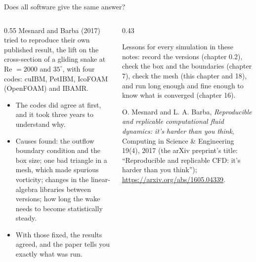 \documentclass[aspectratio=169,11pt]{beamer}
\begin{document}
\begin{frame}{Does all software give the same answer?}
\begin{columns}[T,onlytextwidth]
\begin{column}{0.55\textwidth}
Mesnard and Barba (2017) tried to reproduce their own published result, the lift on the cross-section of a gliding snake at Re $= 2000$ and $35^\circ$, with four codes: cuIBM, PetIBM, IcoFOAM (OpenFOAM) and IBAMR.
\begin{itemize}
  \item The codes did  agree at first, and it took three years to understand why.
  \item Causes found: the outflow boundary condition and the box size; one bad triangle in a mesh, which made spurious vorticity; changes in the linear-algebra libraries between versions; how long the wake needs to become statistically steady.
  \item With those fixed, the results agreed, and the paper tells you exactly what was run.
\end{itemize}
\end{column}
\begin{column}{0.43\textwidth}
\begin{punchbox}
\small Lessons for every simulation in these notes: record the versions (chapter 0.2), check the box and the boundaries (chapter 7), check the mesh (this chapter and 18), and run long enough and fine enough to know what is converged (chapter 16).
\end{punchbox}
\vspace{2mm}
\small O. Mesnard and L. A. Barba, \emph{Reproducible and replicable computational fluid dynamics: it's harder than you think}, Computing in Science \& Engineering 19(4), 2017 (the arXiv preprint's title: ``Reproducible and replicable CFD: it's harder than you think''); \url{https://arxiv.org/abs/1605.04339}.
\end{column}
\end{columns}
\end{frame}
\end{document}
